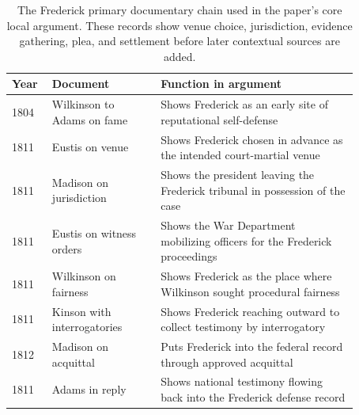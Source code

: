 \begin{table}[t]
\centering
\small
\begin{tabular}{p{0.08\linewidth}>{\raggedright\arraybackslash}p{0.28\linewidth}>{\raggedright\arraybackslash}p{0.51\linewidth}}
\toprule
Year & Document & Function in argument \\
\midrule
1804 & Wilkinson to Adams on fame & Shows Frederick as an early site of reputational self-defense \\
1811 & Eustis on venue & Shows Frederick chosen in advance as the intended court-martial venue \\
1811 & Madison on jurisdiction & Shows the president leaving the Frederick tribunal in possession of the case \\
1811 & Eustis on witness orders & Shows the War Department mobilizing officers for the Frederick proceedings \\
1811 & Wilkinson on fairness & Shows Frederick as the place where Wilkinson sought procedural fairness \\
1811 & Kinson with interrogatories & Shows Frederick reaching outward to collect testimony by interrogatory \\
1812 & Madison on acquittal & Puts Frederick into the federal record through approved acquittal \\
1811 & Adams in reply & Shows national testimony flowing back into the Frederick defense record \\
\bottomrule
\end{tabular}
\caption{The Frederick primary documentary chain used in the paper's core local argument. These records show venue choice, jurisdiction, evidence gathering, plea, and settlement before later contextual sources are added.}
\label{tab:frederickspine}
\end{table}
